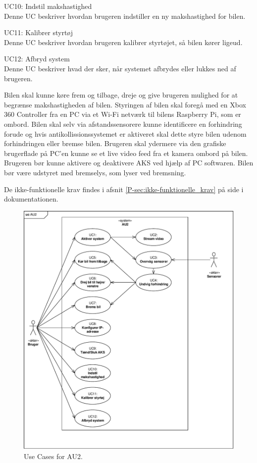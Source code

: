 \begin{packed_item}
\item UC10: Indstil makshastighed \\
Denne UC beskriver hvordan brugeren indstiller en ny makshastighed for bilen.

\item UC11: Kalibrer styrtøj \\
Denne UC beskriver hvordan brugeren kalibrer styrtøjet, så bilen kører ligeud.

\item UC12: Afbryd system \\
Denne UC beskriver hvad der sker, når systemet afbrydes eller lukkes ned af brugeren.

\end{packed_item}

Bilen skal kunne køre frem og tilbage, dreje og give brugeren mulighed for at begrænse makshastigheden af bilen. 
Styringen af bilen skal foregå med en Xbox 360 Controller fra en PC via et Wi-Fi netværk til bilens Raspberry Pi, som er ombord.
Bilen skal selv via afstandssensorere kunne identificere en forhindring forude og hvis antikollissionssystemet er aktiveret skal dette styre bilen udenom forhindringen eller bremse bilen.
Brugeren skal ydermere via den grafiske brugerflade på PC'en kunne se et live video feed fra et kamera ombord på bilen.
Brugeren bør kunne aktivere og deaktivere AKS ved hjælp af PC softwaren.
Bilen bør være udstyret med bremselys, som lyser ved bremsning.

De ikke-funktionelle krav findes i afsnit \ref{P-sec:ikke-funktionelle_krav}  på side \pageref{P-sec:ikke-funktionelle_krav} i dokumentationen.

\clearpage

\begin{figure}[h]
\centering
\includegraphics[width=\textwidth]{../fig/diagrammer/uc_au2}
\caption{Use Cases for AU2.}
\label{fig:use_cases}
\end{figure}